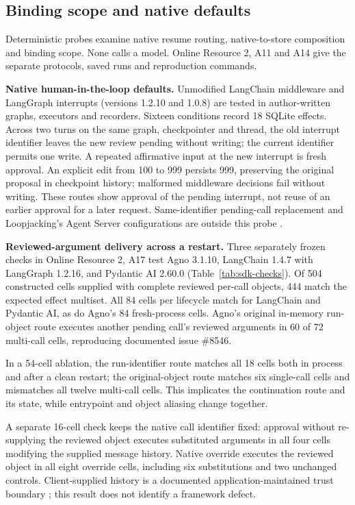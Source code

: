 \documentclass[pdflatex,sn-basic]{sn-jnl}
\begin{document}
\subsection{Binding scope and native defaults}\label{binding-scope-and-native-defaults}

Deterministic probes examine native resume routing, native-to-store composition and binding scope. None calls a model. Online Resource 2, A11 and A14 give the separate protocols, saved runs and reproduction commands.

\textbf{Native human-in-the-loop defaults.} Unmodified LangChain middleware \citep{langchain-hitl} and LangGraph interrupts (versions 1.2.10 and 1.0.8) are tested in author-written graphs, executors and recorders. Sixteen conditions record 18 SQLite effects. Across two turns on the same graph, checkpointer and thread, the old interrupt identifier leaves the new review pending without writing; the current identifier permits one write. A repeated affirmative input at the new interrupt is fresh approval. An explicit edit from 100 to 999 persists 999, preserving the original proposal in checkpoint history; malformed middleware decisions fail without writing. These routes show approval of the pending interrupt, not reuse of an earlier approval for a later request. Same-identifier pending-call replacement and Loopjacking's Agent Server configurations are outside this probe \citep{kumar2026loopjacking}.

\textbf{Reviewed-argument delivery across a restart.} Three separately frozen checks in Online Resource 2, A17 test Agno 3.1.10, LangChain 1.4.7 with LangGraph 1.2.16, and Pydantic AI 2.60.0 (Table~\ref{tab:sdk-checks}). Of 504 constructed cells supplied with complete reviewed per-call objects, 444 match the expected effect multiset. All 84 cells per lifecycle match for LangChain and Pydantic AI, as do Agno's 84 fresh-process cells. Agno's original in-memory run-object route executes another pending call's reviewed arguments in 60 of 72 multi-call cells, reproducing documented issue \#8546.

In a 54-cell ablation, the run-identifier route matches all 18 cells both in process and after a clean restart; the original-object route matches six single-call cells and mismatches all twelve multi-call cells. This implicates the continuation route and its state, while entrypoint and object aliasing change together.

A separate 16-cell check keeps the native call identifier fixed: approval without re-supplying the reviewed object executes substituted arguments in all four cells modifying the supplied message history. Native override executes the reviewed object in all eight override cells, including six substitutions and two unchanged controls. Client-supplied history is a documented application-maintained trust boundary \citep{pydantic-ai-docs}; this result does not identify a framework defect.
\end{document}

